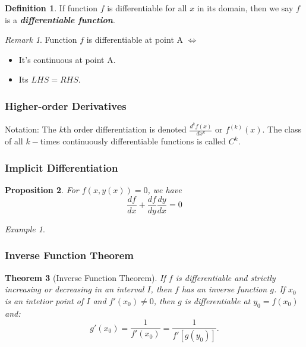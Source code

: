 \documentclass{amsart}
\newtheorem{theorem}{Theorem}[section]
\newtheorem{proposition}[theorem]{Proposition}
\theoremstyle{definition}
\newtheorem{definition}[theorem]{Definition}
\theoremstyle{remark}
\newtheorem*{example*}{Example}
\newtheorem*{remark*}{Remark}
\numberwithin{equation}{section}
\begin{document}
\begin{definition}
    If function $f$ is differentiable for all $x$ in its domain, then we say $f$ is a \textbf{\textit{differentiable function}}.
\end{definition}

\begin{remark*}
    Function $f$ is differentiable at point A $\iff $
    \begin{itemize}
        \item It's continuous at point A.
        \item Its $LHS = RHS$.
    \end{itemize}
\end{remark*}

\subsubsection{Higher-order Derivatives}

Notation: The $k$th order differentiation is denoted $\frac{d ^{k}f(x)}{dx ^{k}}$ or $f ^{(k)}(x)$. The class of all $k-$times continuously differentiable functions is called $C^k$.

\subsubsection{Implicit Differentiation}

\begin{proposition}
    For $f(x, y(x)) = 0$, we have \begin{equation*}
        \frac{df}{dx} + \frac{df}{dy}\frac{dy}{dx} = 0
    \end{equation*}
\end{proposition}

\begin{example*}
\end{example*}


\subsubsection{Inverse Function Theorem}

\begin{theorem}[Inverse Function Theorem]
    If $f$ is differentiable and strictly increasing or decreasing in an interval $I$, then $f$ has an inverse function $g$. If $x_0$ is an intetior point of $I$ and $f'(x_0) \neq 0$, then $g$ is differentiable at $y_0 = f(x_0)$ and: \begin{equation*}
        g'(x_0) = \frac{1}{f'(x_0)} = \frac{1}{f'[g(y_0)]}.
    \end{equation*}
\end{theorem}
\end{document}
